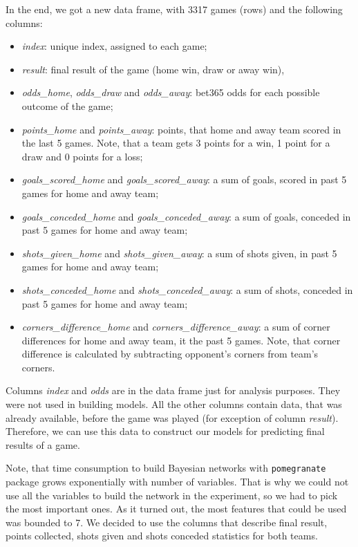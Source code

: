 \documentclass[conference]{IEEEtran}
\begin{document}
In the end, we got a new data frame, with 3317 games (rows) and the following columns:
\begin{itemize}
    \item \textit{index}: unique index, assigned to each game;
    \item \textit{result}: final result of the game (home win, draw or away win),
    \item \textit{odds\_home}, \textit{odds\_draw} and \textit{odds\_away}: bet365 odds for each possible outcome of the game;
    \item \textit{points\_home} and \textit{points\_away}: points, that home and away team scored in the last 5 games. Note,
    that a team gets 3 points for a win, 1 point for a draw and 0 points for a loss;
    \item \textit{goals\_scored\_home} and \textit{goals\_scored\_away}: a sum of goals, scored in past 5 games for home and away
    team;
    \item \textit{goals\_conceded\_home} and \textit{goals\_conceded\_away}: a sum of goals, conceded in past 5 games for home 
    and away team;
    \item \textit{shots\_given\_home} and \textit{shots\_given\_away}: a sum of shots given, in past 5 games for home 
    and away team;
    \item \textit{shots\_conceded\_home} and \textit{shots\_conceded\_away}: a sum of shots, conceded in past 5 games for home 
    and away team;
    \item \textit{corners\_difference\_home} and \textit{corners\_difference\_away}: a sum of corner differences for home and away team, it the past 5 games. Note, that corner difference is calculated by subtracting opponent's corners from team's corners. 
\end{itemize}

Columns \textit{index} and \textit{odds} are in the data frame just for analysis purposes. 
They were not used in building models. All the other columns contain data, that was already
available, before the game was played (for exception of column \textit{result}). Therefore, 
we can use this data to construct our models for predicting final results of a game.

Note, that time consumption to build Bayesian networks with \texttt{pomegranate} package 
grows exponentially with number of variables. That is why we could not use all the variables 
to build the network in the experiment, so we had to pick the most important ones. As it 
turned out, the most features that could be used was bounded to 7. We decided to use the 
columns that describe final result, points collected, shots given and shots conceded statistics 
for both teams.
\end{document}
